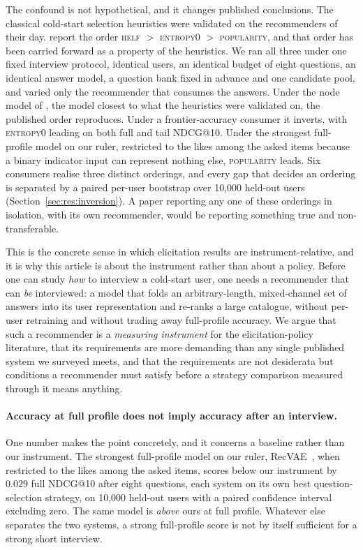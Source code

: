 \documentclass[acmsmall,review,anonymous]{acmart}
\begin{document}
The confound is not hypothetical, and it changes published conclusions. The classical cold-start selection heuristics were validated on the recommenders of their day. \citet{rashid2002getting} report the order \textsc{helf} $>$ \textsc{entropy0} $>$ \textsc{popularity}, and that order has been carried forward as a property of the heuristics. We ran all three under one fixed interview protocol, identical users, an identical budget of eight questions, an identical answer model, a question bank fixed in advance and one candidate pool, and varied only the recommender that consumes the answers. Under the node model of \citet{golbandi2011adaptive}, the model closest to what the heuristics were validated on, the published order reproduces. Under a frontier-accuracy consumer it inverts, with \textsc{entropy0} leading on both full and tail NDCG@10. Under the strongest full-profile model on our ruler, restricted to the likes among the asked items because a binary indicator input can represent nothing else, \textsc{popularity} leads. Six consumers realise three distinct orderings, and every gap that decides an ordering is separated by a paired per-user bootstrap over 10,000 held-out users (Section~\ref{sec:res:inversion}). A paper reporting any one of these orderings in isolation, with its own recommender, would be reporting something true and non-transferable.

This is the concrete sense in which elicitation results are instrument-relative, and it is why this article is about the instrument rather than about a policy. Before one can study \emph{how} to interview a cold-start user, one needs a recommender that can \emph{be} interviewed: a model that folds an arbitrary-length, mixed-channel set of answers into its user representation and re-ranks a large catalogue, without per-user retraining and without trading away full-profile accuracy. We argue that such a recommender is a \emph{measuring instrument} for the elicitation-policy literature, that its requirements are more demanding than any single published system we surveyed meets, and that the requirements are not desiderata but conditions a recommender must satisfy before a strategy comparison measured through it means anything.

\paragraph{Accuracy at full profile does not imply accuracy after an interview.} One number makes the point concretely, and it concerns a baseline rather than our instrument. The strongest full-profile model on our ruler, RecVAE~\citep{ren2020recvae}, when restricted to the likes among the asked items, scores below our instrument by $0.029$ full NDCG@10 after eight questions, each system on its own best question-selection strategy, on 10,000 held-out users with a paired confidence interval excluding zero. The same model is \emph{above} ours at full profile. Whatever else separates the two systems, a strong full-profile score is not by itself sufficient for a strong short interview.
\end{document}
